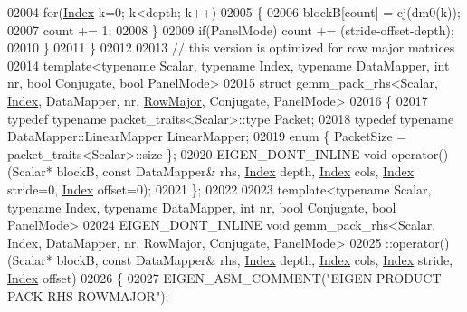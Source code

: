 \begin{DoxyCode}
02004     \textcolor{keywordflow}{for}(\hyperlink{namespace_eigen_a62e77e0933482dafde8fe197d9a2cfde}{Index} k=0; k<depth; k++)
02005     \{
02006       blockB[count] = cj(dm0(k));
02007       count += 1;
02008     \}
02009     \textcolor{keywordflow}{if}(PanelMode) count += (stride-offset-depth);
02010   \}
02011 \}
02012 
02013 \textcolor{comment}{// this version is optimized for row major matrices}
02014 \textcolor{keyword}{template}<\textcolor{keyword}{typename} Scalar, \textcolor{keyword}{typename} Index, \textcolor{keyword}{typename} DataMapper, \textcolor{keywordtype}{int} nr, \textcolor{keywordtype}{bool} Conjugate, \textcolor{keywordtype}{bool} PanelMode>
02015 \textcolor{keyword}{struct }gemm\_pack\_rhs<Scalar, \hyperlink{namespace_eigen_a62e77e0933482dafde8fe197d9a2cfde}{Index}, DataMapper, nr, \hyperlink{group__enums_ggaacded1a18ae58b0f554751f6cdf9eb13acfcde9cd8677c5f7caf6bd603666aae3}{RowMajor}, Conjugate, PanelMode>
02016 \{
02017   \textcolor{keyword}{typedef} \textcolor{keyword}{typename} packet\_traits<Scalar>::type Packet;
02018   \textcolor{keyword}{typedef} \textcolor{keyword}{typename} DataMapper::LinearMapper LinearMapper;
02019   \textcolor{keyword}{enum} \{ PacketSize = packet\_traits<Scalar>::size \};
02020   EIGEN\_DONT\_INLINE \textcolor{keywordtype}{void} operator()(Scalar* blockB, \textcolor{keyword}{const} DataMapper& rhs, \hyperlink{namespace_eigen_a62e77e0933482dafde8fe197d9a2cfde}{Index} depth, 
      \hyperlink{namespace_eigen_a62e77e0933482dafde8fe197d9a2cfde}{Index} cols, \hyperlink{namespace_eigen_a62e77e0933482dafde8fe197d9a2cfde}{Index} stride=0, \hyperlink{namespace_eigen_a62e77e0933482dafde8fe197d9a2cfde}{Index} offset=0);
02021 \};
02022 
02023 \textcolor{keyword}{template}<\textcolor{keyword}{typename} Scalar, \textcolor{keyword}{typename} Index, \textcolor{keyword}{typename} DataMapper, \textcolor{keywordtype}{int} nr, \textcolor{keywordtype}{bool} Conjugate, \textcolor{keywordtype}{bool} PanelMode>
02024 EIGEN\_DONT\_INLINE \textcolor{keywordtype}{void} gemm\_pack\_rhs<Scalar, Index, DataMapper, nr, RowMajor, Conjugate, PanelMode>
02025   ::operator()(Scalar* blockB, \textcolor{keyword}{const} DataMapper& rhs, \hyperlink{namespace_eigen_a62e77e0933482dafde8fe197d9a2cfde}{Index} depth, \hyperlink{namespace_eigen_a62e77e0933482dafde8fe197d9a2cfde}{Index} cols, 
      \hyperlink{namespace_eigen_a62e77e0933482dafde8fe197d9a2cfde}{Index} stride, \hyperlink{namespace_eigen_a62e77e0933482dafde8fe197d9a2cfde}{Index} offset)
02026 \{
02027   EIGEN\_ASM\_COMMENT(\textcolor{stringliteral}{"EIGEN PRODUCT PACK RHS ROWMAJOR"});

\end{DoxyCode}
